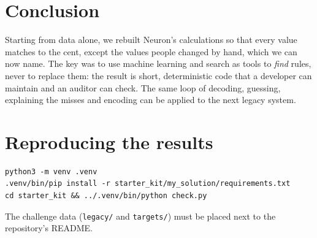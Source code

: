 \documentclass[11pt,a4paper]{article}
\newcommand{\code}[1]{\texttt{#1}}
\begin{document}
\section{Conclusion}

Starting from data alone, we rebuilt Neuron's calculations so that every value matches to the cent, except the values
people changed by hand, which we can now name. The key was to use machine learning and search as tools to
\emph{find} rules, never to replace them: the result is short, deterministic code that a developer can maintain and
an auditor can check. The same loop of decoding, guessing, explaining the misses and encoding can be applied to the
next legacy system.

\appendix
\section{Reproducing the results}
\begin{verbatim}
python3 -m venv .venv
.venv/bin/pip install -r starter_kit/my_solution/requirements.txt
cd starter_kit && ../.venv/bin/python check.py
\end{verbatim}
The challenge data (\code{legacy/} and \code{targets/}) must be placed next to the repository's README.
\end{document}
